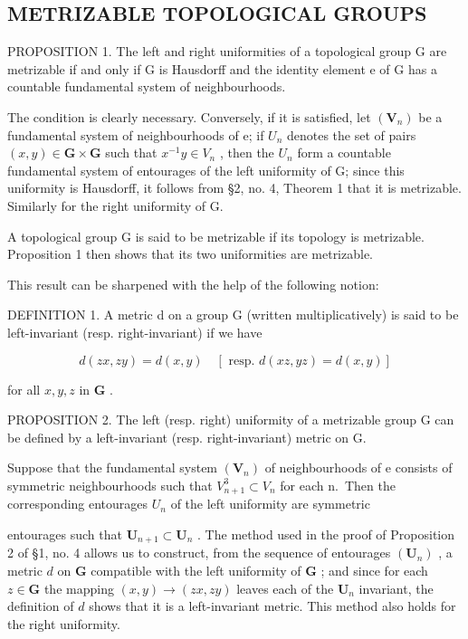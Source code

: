 \subsection{METRIZABLE TOPOLOGICAL GROUPS}

PROPOSITION 1. The left and right uniformities of a topological group G are metrizable if and only if G is Hausdorff and the identity element e of G has a countable fundamental system of neighbourhoods.

The condition is clearly necessary. Conversely, if it is satisfied, let \((\mathbf{V}_{n})\) be a fundamental system of neighbourhoods of e; if \(U_{n}\) denotes the set of pairs \((x, y) \in \mathbf{G} \times \mathbf{G}\) such that \(x^{-1}y \in V_{n}\) , then the \(U_{n}\) form a countable fundamental system of entourages of the left uniformity of G; since this uniformity is Hausdorff, it follows from §2, no. 4, Theorem 1 that it is metrizable. Similarly for the right uniformity of G.

A topological group G is said to be metrizable if its topology is metrizable. Proposition 1 then shows that its two uniformities are metrizable.

This result can be sharpened with the help of the following notion:

DEFINITION 1. A metric d on a group G (written multiplicatively) is said to be left-invariant (resp. right-invariant) if we have

\[
d (z x, z y) = d (x, y) \quad [ \text { resp. } d (x z, y z) = d (x, y) ]
\]

for all \(x, y, z\) in \(\mathbf{G}\) .

PROPOSITION 2. The left (resp. right) uniformity of a metrizable group G can be defined by a left-invariant (resp. right-invariant) metric on G.

Suppose that the fundamental system \((\mathbf{V}_{n})\) of neighbourhoods of e consists of symmetric neighbourhoods such that \(V_{n+1}^{3} \subset V_{n}\) for each n.~Then the corresponding entourages \(U_{n}\) of the left uniformity are symmetric

entourages such that \(\mathbf{U}_{n+1} \subset \mathbf{U}_n\) . The method used in the proof of Proposition 2 of §1, no. 4 allows us to construct, from the sequence of entourages \((\mathbf{U}_n)\) , a metric \(d\) on \(\mathbf{G}\) compatible with the left uniformity of \(\mathbf{G}\) ; and since for each \(z \in \mathbf{G}\) the mapping \((x, y) \to (zx, zy)\) leaves each of the \(\mathbf{U}_n\) invariant, the definition of \(d\) shows that it is a left-invariant metric. This method also holds for the right uniformity.

